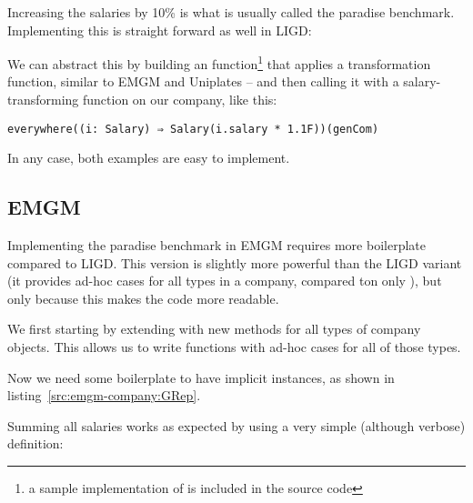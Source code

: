 \begin{example}

Increasing the salaries by 10\% is what is usually called the paradise
benchmark. Implementing this is straight forward as well in LIGD:



We can abstract this by building an  function\footnote{a sample implementation of  is included in the source code} that applies
a transformation function, similar to EMGM and Uniplates  -- and
then calling it with a salary-transforming function on our company,
like this:
\begin{lstlisting}[caption=Increase the salaries using \cd{everywhere}]
  everywhere((i: Salary) ⇒ Salary(i.salary * 1.1F))(genCom)
\end{lstlisting}

\end{example}

In any case, both examples are easy to implement.


\subsection{EMGM}

Implementing the paradise benchmark in EMGM requires more boilerplate compared
to LIGD. This version is slightly more powerful than the LIGD variant (it
provides ad-hoc cases for all types in a company, compared ton only ),
but only because this makes the code more readable.

We first starting by extending  with new methods for all types of
company objects. This allows us to write functions with ad-hoc cases for all
of those types.



Now we need some boilerplate to have implicit  instances, as shown
in listing~\ref{src:emgm-company:GRep}.


\begin{example}
Summing all salaries works as expected by using a very simple (although
verbose) definition:

\end{example}

